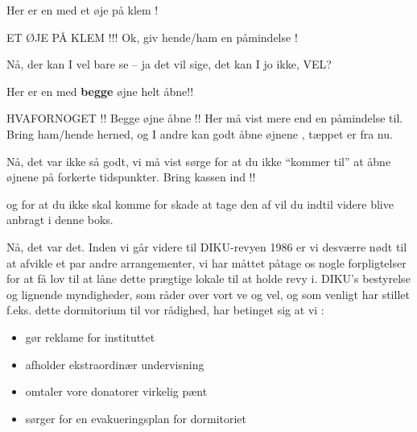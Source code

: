 \documentclass[a4paper,11pt]{article}
\begin{document}
\begin{sketch}
 Her er en med et øje på klem !

 ET ØJE PÅ KLEM !!! Ok, giv hende/ham en påmindelse !


 Nå, der kan I vel bare se -- ja det vil sige, det kan I jo ikke, VEL?

 Her er en med \textbf{begge} øjne helt åbne!!


 HVAFORNOGET !!  Begge øjne åbne !!  Her må vist mere end en påmindelse
til.  Bring ham/hende herned, og I andre kan godt åbne øjnene , tæppet er fra nu.


 Nå, det var ikke så godt, vi må vist sørge for at du ikke ``kommer
til'' at åbne øjnene på forkerte tidspunkter. Bring kassen ind !!


 og for at du ikke skal komme for skade at tage den af vil du indtil
videre blive anbragt i denne boks.


 Nå, det var det. Inden vi går videre til DIKU-revyen 1986 er vi
desværre nødt til at afvikle et par andre arrangementer, vi har måttet påtage os
nogle forpligtelser for at få lov til at låne dette prægtige lokale til at holde
revy i.  DIKU's bestyrelse og lignende myndigheder, som råder over vort ve og
vel, og som venligt har stillet f.eks. dette dormitorium til vor rådighed, har
betinget sig at vi :
\begin{itemize}
\item gør reklame for instituttet
\item afholder ekstraordinær undervisning
\item omtaler vore donatorer virkelig pænt
\item sørger for en evakueringsplan for dormitoriet
\end{itemize}


\end{sketch}
\end{document}
